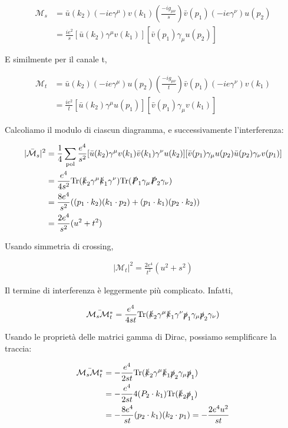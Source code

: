 \documentclass[11pt]{report}
\begin{document}
\begin{align}
    \mathcal{M}_s &= \bar{u}(k_2)(-ie\gamma^\mu)v(k_1)\left(\frac{-ig_{\mu\nu}}{s} \right)\bar{v}(p_1)(-ie\gamma^\nu)u(p_2) \\
    &= \frac{ie^2}{s}[\bar{u}(k_2)\gamma^\mu v(k_1)][\bar{v}(p_1)\gamma_\mu u(p_2)]
\end{align}

E similmente per il canale t, 

\begin{align}
    \mathcal{M}_t &= \bar{u}(k_2)(-ie\gamma^\mu)u(p_2)\left(\frac{-ig_{\mu\nu}}{t} \right)\bar{v}(p_1)(-ie\gamma^\nu)v(k_1) \\
    &= \frac{ie^2}{t}[\bar{u}(k_2)\gamma^\mu u(p_1)][\bar{v}(p_1)\gamma_\mu v(k_1)]
\end{align}

Calcoliamo il modulo di ciascun diagramma, e successivamente l'interferenza: 

\begin{align}
    |\mathcal{\bar{M}}_s|^2 &= \frac{1}{4}\sum_{\text{pol}}\frac{e^4}{s^2}[\bar{u}(k_2)\gamma^\mu v(k_1) \bar{v}(k_1)\gamma^\nu u(k_2)][\bar{v}(p_1)\gamma_\mu u(p_2) \bar{u}(p_2) \gamma_\nu v(p_1)] \\
    &= \frac{e^4}{4s^2}\text{Tr}(\slashed{k}_2 \gamma^\mu \slashed{k}_1 \gamma^\nu)\text{Tr}(\slashed{P}_1 \gamma_\mu \slashed{P}_2 \gamma_\nu) \\ 
    &= \frac{8e^4}{s^2}((p_1\cdot k_2)(k_1 \cdot p_2) + (p_1\cdot k_1)(p_2\cdot k_2)) \\
    &= \frac{2e^4}{s^2}(u^2 + t^2)
\end{align}

Usando simmetria di crossing, 

\begin{align}
    |\mathcal{M}_t|^2 = \frac{2e^4}{t^2}(u^2 + s^2)
\end{align}

Il termine di interferenza è leggermente più complicato. Infatti, 

\begin{align}
    \bar{\mathcal{M}_s \mathcal{M}^*_t} = \frac{e^4}{4st}\text{Tr}(\slashed{k}_2 \gamma^\mu \slashed{k}_1 \gamma^\nu \slashed{p}_1 \gamma_\mu \slashed{p}_2 \gamma_\nu)
\end{align}

Usando le proprietà delle matrici gamma di Dirac, possiamo semplificare la traccia: 

\begin{align}
    \bar{\mathcal{M}_s \mathcal{M}^*_t} &= -\frac{e^4}{2st}\text{Tr}(\slashed{k}_2\gamma^\mu \slashed{k}_1 \slashed{p}_2\gamma_\mu \slashed{p}_1) \\
    &= -\frac{e^4}{2st}4(P_2\cdot k_1)\text{Tr}(\slashed{k}_2\slashed{p}_1) \\
    &= -\frac{8e^4}{st}(p_2\cdot k_1)(k_2 \cdot p_1) = -\frac{2 e^4 u^2}{st}
\end{align}
\end{document}
